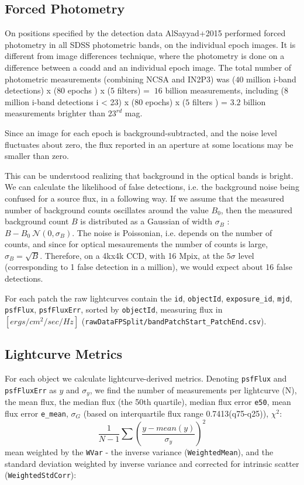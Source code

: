 \documentclass[fleqn,usenatbib]{mnras}  %
\begin{document}
\subsection{Forced Photometry}
On positions specified by the detection data AlSayyad+2015 performed forced photometry in all SDSS photometric bands, on the individual epoch images. It is different from image differences technique, where the photometry is done on a difference between a coadd and an individual epoch image.  The total number of photometric measurements (combining NCSA and IN2P3) was  ($40$  million i-band detections) x ($80$ epochs ) x ($5$ filters) = $~16$ billion measurements, including   ($8$ million i-band detections i < 23) x ($80$ epochs) x ($5$ filters ) = $3.2$ billion measurements brighter than $23^{rd}$ mag.

Since an image for each epoch is background-subtracted, and the noise level fluctuates about zero,  the flux reported in an aperture at some locations may be smaller than zero. 

This can be understood realizing that background in the  optical bands is bright. We can calculate the likelihood of false detections, i.e. the background noise being confused for a source flux, in a following way. If we assume that the measured number of background counts oscillates around the value $B_{0}$, then the measured background count $B$  is distributed as  a Gaussian of width $\sigma_{B}$ :   $B-B_{0}  ~  \mathcal{N}(0,\sigma_{B})$. The noise is Poissonian, i.e. depends on  the number of counts, and since for optical mesaurements the number of counts is large,  $\sigma_{B} = \sqrt {B}$. Therefore, on a 4kx4k  CCD, with 16 Mpix, at the $5\sigma$ level (corresponding  to  1 false detection in a million), we would expect about 16 false detections.  

For each patch the raw lightcurves contain the \verb|id|, \verb|objectId|, \verb|exposure_id|, \verb|mjd|, \verb|psfFlux|, \verb|psfFluxErr|, sorted by \verb|objectId|, measuring flux in $[ergs/ cm^{2} / sec / Hz]$ (\verb|rawDataFPSplit/bandPatchStart_PatchEnd.csv|). 

\subsection{Lightcurve Metrics}
For each object we calculate lightcurve-derived metrics. Denoting \verb|psfFlux| and \verb|psfFluxErr| as $y$ and $\sigma_{y}$, we find the number of measurements per lightcurve (N), the mean flux, the median flux (the 50th quartile), median flux error \verb|e50|, mean flux error \verb|e_mean|, $\sigma_{G}$ (based on interquartile flux range 0.7413(q75-q25)), $\chi^{2}$:
\begin{equation}
\frac{1}{N-1} \sum{\left( \frac{y-mean(y)}{\sigma_{y}} \right) ^{2}}
\end{equation}
 mean weighted by the \verb|WVar| - the inverse variance (\verb|WeightedMean|), and the standard deviation weighted by inverse variance and corrected for intrinsic scatter (\verb|WeightedStdCorr|):
\end{document}
